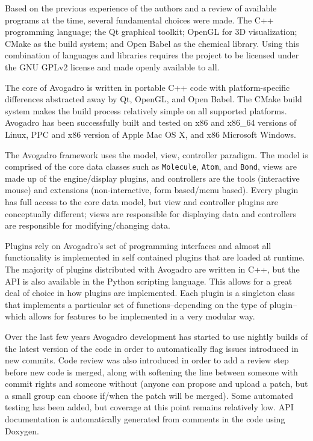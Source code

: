 \documentclass[10pt]{bmc_article}
\newenvironment{bmcformat}{\begin{raggedright}
\baselineskip20pt\sloppy\setboolean{publ}{false}}{\end{raggedright}
\baselineskip20pt\sloppy}
\begin{document}
\begin{bmcformat}
Based on the previous experience of the authors and a review of
available programs at the time, several fundamental choices were made.
The C++ programming language; the Qt graphical toolkit;
OpenGL for 3D visualization; CMake as the build system; and Open Babel as
the chemical library. Using this combination of languages and
libraries requires the project to be licensed under the GNU GPLv2
license and made openly available to all.

The core of Avogadro is written in portable C++ code with platform-specific
differences abstracted away by Qt, OpenGL, and Open Babel. The CMake build system
makes the build process relatively simple on all supported platforms. Avogadro
has been successfully built and tested on x86 and x86\_64 versions of Linux, PPC
and x86 version of Apple Mac OS X, and x86 Microsoft Windows.

The Avogadro framework uses the model, view, controller paradigm. The model
is comprised of the core data classes such as {\tt Molecule}, {\tt Atom}, and
{\tt Bond}, views are made up of the engine/display plugins, and
controllers are the tools (interactive mouse) and extensions
(non-interactive, form based/menu based). Every plugin has full access
to the core data model, but view and controller plugins are
conceptually different; views are responsible for displaying
data and controllers are responsible for modifying/changing data.

Plugins rely on Avogadro's set of programming interfaces and almost
all functionality is implemented in self contained plugins that are
loaded at runtime. The majority of plugins distributed with Avogadro
are written in C++, but the API is also available in the Python
scripting language. This allows for a great deal of choice in how
plugins are implemented. Each plugin is a singleton class that
implements a particular set of functions--depending on the type of
plugin--which allows for features to be implemented in a very modular
way.

Over the last few years Avogadro development has started to use nightly builds
of the latest version of the code in order to automatically flag issues
introduced in new commits. Code review was also introduced in order to add a
review step before new code is merged, along with softening the line between
someone with commit rights and someone without (anyone can propose and upload
a patch, but a small group can choose if/when the patch will be merged). Some
automated testing has been added, but coverage at this point remains relatively
low. API documentation is automatically generated from comments in the code
using Doxygen.


\end{bmcformat}
\end{document}
